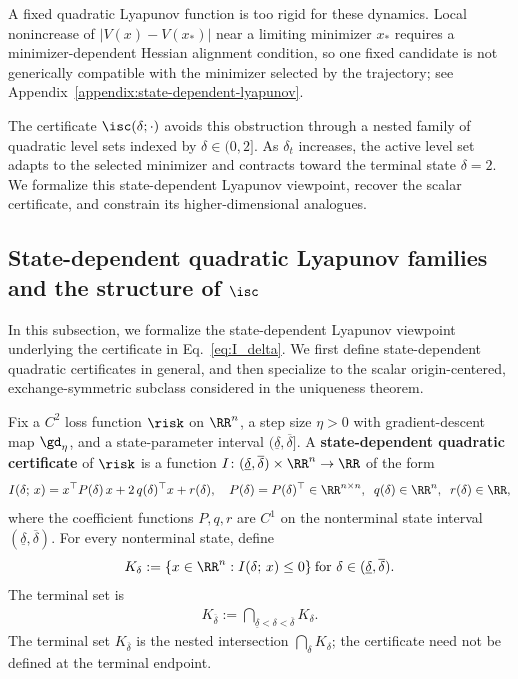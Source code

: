 \documentclass{article}
\begin{document}
A fixed quadratic Lyapunov function is too rigid for these dynamics. Local
nonincrease of $|V(x)-V(x_*)|$ near a limiting minimizer $x_*$ requires a
minimizer-dependent Hessian alignment condition, so one fixed candidate is not
generically compatible with the minimizer selected by the trajectory; see
Appendix~\ref{appendix:state-dependent-lyapunov}.

The certificate $\isc(\delta;\cdot)$ avoids this obstruction through a nested
family of quadratic level sets indexed by $\delta\in(0,2]$. As $\delta_t$
increases, the active level set adapts to the selected minimizer and contracts
toward the terminal state $\delta=2$. We formalize this state-dependent
Lyapunov viewpoint, recover the scalar certificate, and constrain its
higher-dimensional analogues.

\subsection{State-dependent quadratic Lyapunov families and the structure of \texorpdfstring{$\isc$}{Isc}}
\label{subsec:structure_of_state_dependent_lyapunov}

In this subsection, we formalize the state-dependent Lyapunov viewpoint
underlying the certificate in Eq.~\eqref{eq:I_delta}. We first define
state-dependent quadratic certificates in general, and then specialize to the
scalar origin-centered, exchange-symmetric subclass considered in the
uniqueness theorem.

Fix a $C^2$ loss function $\risk$ on $\RR^n$, a step size $\eta>0$ with
gradient-descent map $\gd_\eta$, and a state-parameter interval
$(\underline\delta,\overline\delta]$. A
\textbf{state-dependent quadratic certificate} of $\risk$ is a function
$I\colon(\underline\delta,\overline\delta)\times\RR^n\to\RR$ of the form
\begin{align}
    I(\delta;\,x)
    = x^\top P(\delta)\,x + 2\,q(\delta)^\top x + r(\delta),
    \quad
    P(\delta) = P(\delta)^\top \in \RR^{n \times n},
    \;\; q(\delta) \in \RR^n,
    \;\; r(\delta) \in \RR,
\end{align}
where the coefficient functions $P,q,r$ are $C^1$ on the nonterminal state
interval $(\underline\delta,\overline\delta)$. For every nonterminal state,
define
\begin{align}
    K_\delta := \{x \in \RR^n : I(\delta;\,x) \le 0\}
    \: \text{for}\ \delta \in (\underline\delta, \overline\delta).
\end{align}
The terminal set is
\begin{align}
    K_{\overline\delta}
    := \bigcap_{\underline\delta < \delta < \overline\delta} K_\delta.
\end{align}
The terminal set $K_{\overline\delta}$ is the nested intersection
$\bigcap_\delta K_\delta$; the certificate need not be defined at the terminal
endpoint.
\end{document}
